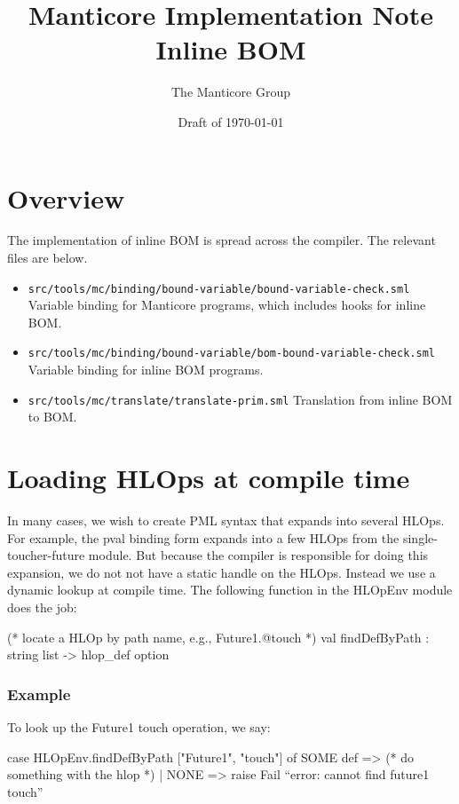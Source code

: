 \documentclass[11pt]{article}
\title{Manticore Implementation Note \\ Inline BOM}
\author{The Manticore Group}
\date{Draft of \today}
\begin{document}
\maketitle

\section{Overview}
The implementation of inline BOM is spread across the compiler. The relevant files are below.
\begin{itemize}
\item \texttt{src/tools/mc/binding/bound-variable/bound-variable-check.sml} Variable binding for Manticore programs, which includes hooks for inline BOM.
\item \texttt{src/tools/mc/binding/bound-variable/bom-bound-variable-check.sml} Variable binding for inline BOM programs.
\item \texttt{src/tools/mc/translate/translate-prim.sml} Translation from inline BOM to BOM.
\end{itemize}

\section{Loading HLOps at compile time}
In many cases, we wish to create PML syntax that expands into several HLOps. For example, the pval binding form expands into a few HLOps from the single-toucher-future module. But because the compiler is responsible for doing this expansion, we do not not have a static handle on the HLOps. Instead we use a dynamic lookup at compile time. The following function in the HLOpEnv module does the job:
\begin{centercode}
  (* locate a HLOp by path name, e.g., Future1.@touch *)
    val findDefByPath : string list -> hlop_def option
\end{centercode}
\subsubsection{Example}
To look up the Future1 touch operation, we say:
\begin{centercode}
  case HLOpEnv.findDefByPath ["Future1", "touch"]
    of SOME def => (* do something with the hlop *)
     | NONE => raise Fail ``error: cannot find future1 touch''
\end{centercode}
\end{document}
